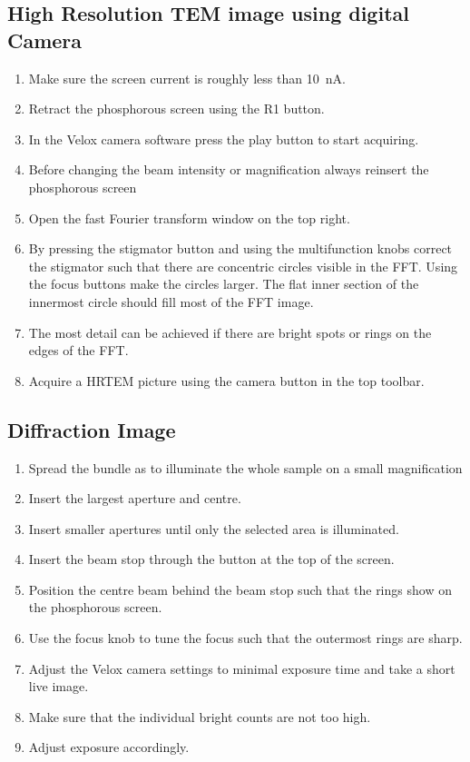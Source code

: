 \documentclass[a4paper]{scrartcl}
\begin{document}
\subsection*{High Resolution TEM image using digital Camera}
\begin{enumerate}
	\item Make sure the screen current is roughly less than \SI{10}{\nano \ampere}.
	\item Retract the phosphorous screen using the R1 button.
	\item In the Velox camera software press the play button to start acquiring.
	\item Before changing the beam intensity or magnification always reinsert the phosphorous screen
	\item Open the fast Fourier transform window on the top right.
	\item By pressing the stigmator button and using the multifunction knobs correct the stigmator such that there are concentric circles visible in the FFT. Using the focus buttons make the circles larger. The flat inner section of the innermost circle should fill most of the FFT image.
	\item The most detail can be achieved if there are bright spots or rings on the edges of the FFT.
	\item Acquire a HRTEM picture using the camera button in the top toolbar.
\end{enumerate}

\subsection*{Diffraction Image}
\begin{enumerate}
	\item Spread the bundle as to illuminate the whole sample on a small magnification
	\item Insert the largest aperture and centre.
	\item Insert smaller apertures until only the selected area is illuminated.
	\item Insert the beam stop through the button at the top of the screen.
	\item Position the centre beam behind the beam stop such that the rings show on the phosphorous screen.
	\item Use the focus knob to tune the focus such that the outermost rings are sharp.
	\item Adjust the Velox camera settings to minimal exposure time and take a short live image.
	\item Make sure that the individual bright counts are not too high.
	\item Adjust exposure accordingly.

\end{enumerate}
\end{document}
